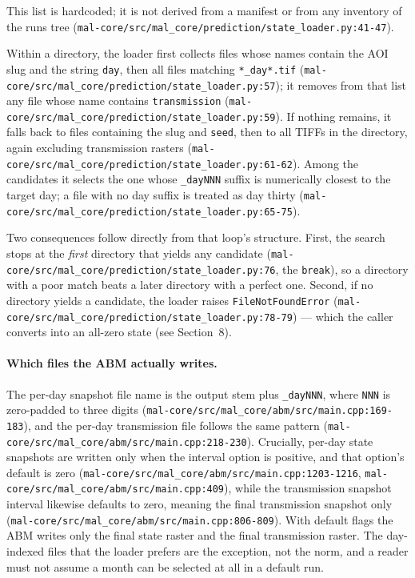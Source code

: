\documentclass[11pt,a4paper]{article}
\newcommand{\code}[1]{\texttt{#1}}
\begin{document}
This list is hardcoded; it is not derived from a manifest or from any
inventory of the runs tree
(\code{mal-core/src/mal\_core/prediction/state\_loader.py:41-47}).

Within a directory, the loader first collects files whose names contain the
AOI slug and the string \code{day}, then all files matching \code{*\_day*.tif}
(\code{mal-core/src/mal\_core/prediction/state\_loader.py:57}); it removes
from that list any file whose name contains \code{transmission}
(\code{mal-core/src/mal\_core/prediction/state\_loader.py:59}). If nothing
remains, it falls back to files containing the slug and \code{seed}, then to
all TIFFs in the directory, again excluding transmission rasters
(\code{mal-core/src/mal\_core/prediction/state\_loader.py:61-62}). Among the
candidates it selects the one whose \code{\_dayNNN} suffix is numerically
closest to the target day; a file with no day suffix is treated as day
thirty (\code{mal-core/src/mal\_core/prediction/state\_loader.py:65-75}).

Two consequences follow directly from that loop's structure. First, the
search stops at the \emph{first} directory that yields any candidate
(\code{mal-core/src/mal\_core/prediction/state\_loader.py:76}, the
\code{break}), so a directory with a poor match beats a later directory with
a perfect one. Second, if no directory yields a candidate, the loader raises
\code{FileNotFoundError}
(\code{mal-core/src/mal\_core/prediction/state\_loader.py:78-79}) --- which the
caller converts into an all-zero state (see
Section~8).

\paragraph{Which files the ABM actually writes.}
The per-day snapshot file name is the output stem plus \code{\_dayNNN},
where \code{NNN} is zero-padded to three digits
(\code{mal-core/src/mal\_core/abm/src/main.cpp:169-183}), and the per-day
transmission file follows the same pattern
(\code{mal-core/src/mal\_core/abm/src/main.cpp:218-230}). Crucially, per-day
state snapshots are written only when the interval option is positive, and
that option's default is zero
(\code{mal-core/src/mal\_core/abm/src/main.cpp:1203-1216},
\code{mal-core/src/mal\_core/abm/src/main.cpp:409}), while the transmission
snapshot interval likewise defaults to zero, meaning the final transmission
snapshot only
(\code{mal-core/src/mal\_core/abm/src/main.cpp:806-809}). With default flags
the ABM writes only the final state raster and the final transmission raster.
The day-indexed files that the loader prefers are the exception, not the
norm, and a reader must not assume a month can be selected at all in a
default run.
\end{document}
